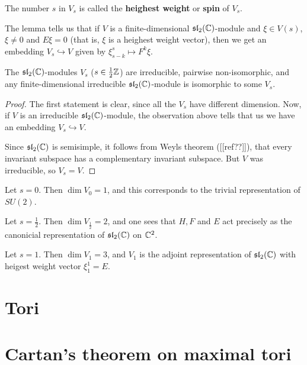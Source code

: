 \documentclass[11pt, english]{article}
\begin{document}
The number $s$ in $V_s$ is called the \textbf{heighest weight} or \textbf{spin} of $V_s$.

The lemma tells us that if $V$ is a finite-dimensional $\mathfrak{sl}_2(\mathbb{C})$-module and $\xi \in V(s)$, $\xi \neq 0$ and $E \xi = 0$ (that is, $\xi$ is a heighest weight vector), then we get an embedding $V_s \hookrightarrow V$ given by $\xi_{s-k}^s \mapsto F^k \xi$.

\begin{thm}
 The $\mathfrak{sl}_2(\mathbb{C})$-modules $V_s$ ($s \in  \frac 12 \mathbb{Z}$) are irreducible, pairwise non-isomorphic, and any finite-dimensional irreducible $\mathfrak{sl}_2(\mathbb{C})$-module is isomorphic to some $V_s$.
\end{thm}
\begin{proof}
The first statement is clear, since all the $V_s$ have different dimension. Now, if $V$ is an irreducible $\mathfrak{sl}_2(\mathbb{C})$-module, the observation above tells that us we have an embedding $V_s \hookrightarrow V$.

Since $\mathfrak{sl}_2(\mathbb{C})$ is semisimple, it follows from Weyls theorem ([[ref??]]), that every invariant subspace has a complementary invariant subspace. But $V$ was irreducible, so $V_s=V$.
\end{proof}

\begin{example}
  Let $s=0$. Then $\dim V_0 = 1$, and this corresponds to the trivial representation of $SU(2)$. 
\end{example}

\begin{example}
 Let $s=\frac 12$. Then $\dim V_{\frac 12} = 2$, and one sees that $H,F$ and $E$ act precisely as the canonicial representation of $\mathfrak{sl}_2(\mathbb{C})$ on $\mathbb{C}^2$. 
\end{example}

\begin{example}
Let $s=1$. Then $\dim V_1 = 3$, and $V_1$ is the adjoint representation of $\mathfrak{sl}_2(\mathbb{C})$ with heigest weight vector $\xi_1^1 = E$. 
\end{example}



\newpage
\section{Tori}

\newpage
\section{Cartan's theorem on maximal tori}
\end{document}
